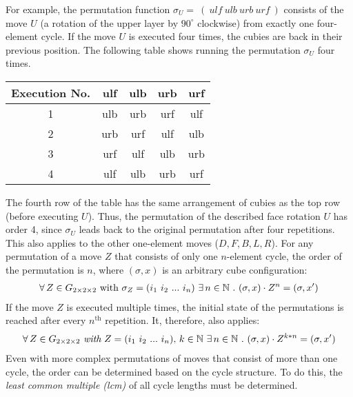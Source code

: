 For example, the permutation function $\sigma_U =\ ( \ \textit{ulf} \ \textit{ulb} \ \textit{urb} \ \textit{urf} \ ) $ consists of the move $U$ (a rotation of the upper layer by $90 ^\circ$ clockwise) from exactly one four-element cycle.
If the move $U$ is executed four times, the cubies are back in their previous position. The following table shows running the permutation $\sigma_U$ four times.
\begin{center}
\begin{tabular}{ccccc}
\toprule
\textbf{Execution No.} & \textbf{ulf} & \textbf{ulb} & \textbf{urb} & \textbf{urf} \\
\midrule
1 & ulb & urb & urf & ulf \\

2 & urb & urf & ulf & ulb \\

3 & urf & ulf & ulb & urb \\

4 & ulf & ulb & urb & urf \\
\bottomrule
\end{tabular}
\end{center}

The fourth row of the table has the same arrangement of cubies as the top row (before executing $U$).
Thus, the permutation of the described face rotation $U$ has order 4, since $\sigma_U$ leads back to the original permutation after four repetitions. This also applies to the other one-element moves ($D, F, B, L, R$).
For any permutation of a move $Z$ that consists of only one $n$-element cycle, the order of the permutation is $n$, where $(\sigma, x)$ is an arbitrary cube configuration:
\begin{align*}
\forall \, Z \in G_{2\times 2\times 2} \ \text{with} \ \sigma_Z=(i_1 \ i_2 \ ... \ i_n) \ \exists \, n \in \mathbb{N} \ . \ (\sigma, x) \cdot Z^n= (\sigma, x')
\end{align*}
If the move $Z$ is executed multiple times, the initial state of the permutations is reached \cite{TD} after every $n^\text{th}$ repetition.
It, therefore, also applies:
\begin{align*}
\forall \, Z \in G_{2\times 2\times 2} \ \textit{with} \ Z=(i_1 \ i_2 \ ... \ i_n), \, k \in \mathbb{N} \ \exists \, n \in \mathbb {N} \ . \ {(\sigma, x) \cdot Z^{k*n}=(\sigma, x') }
\end{align*}
Even with more complex permutations of moves that consist of more than one cycle, the order can be determined based on the cycle structure. To do this, the \textit{least common multiple (lcm)} of all cycle lengths must be determined. \cite{TD}
\newpage
 
